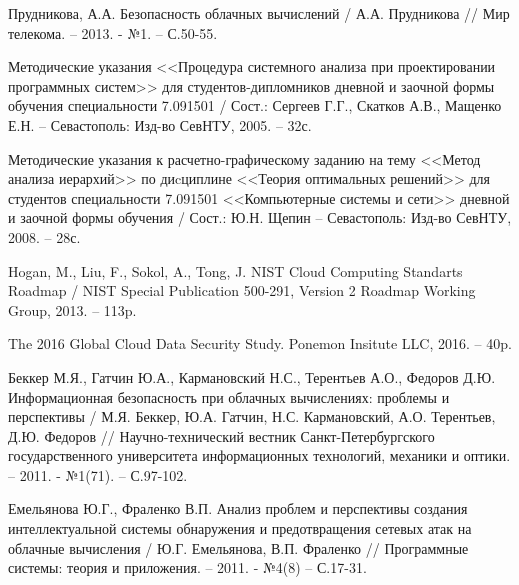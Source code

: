 \begingroup 
\renewcommand{\section}[2]{\anonsection{Библиографический список}}
\begin{thebibliography}{00}

    Прудникова, А.А.
    Безопасность облачных вычислений /
    А.А. Прудникова //
    Мир телекома. -- 2013. - №1.
    -- С.50-55.

    Методические указания <<Процедура системного анализа при проектировании программных систем>>
    для студентов-дипломников дневной и заочной формы обучения специальности 7.091501 /
    Сост.: Сергеев Г.Г., Скатков А.В., Мащенко Е.Н. -- Севастополь:
    Изд-во СевНТУ, 2005. -- 32с.

    Методические указания к расчетно-графическому заданию
    на тему <<Метод анализа иерархий>>  по диcциплине <<Теория оптимальных решений>>
    для студентов специальности 7.091501 <<Компьютерные системы и сети>>
    дневной и заочной формы обучения /
    Сост.: Ю.Н. Щепин -- Севастополь:
    Изд-во СевНТУ, 2008. -- 28с.

    Hogan, M., Liu, F., Sokol, A., Tong, J.
    NIST Cloud Computing Standarts Roadmap /
    NIST Special Publication 500-291, Version 2
    Roadmap Working Group, 2013. -- 113p.

    The 2016 Global Cloud Data Security Study.
    Ponemon Insitute LLC, 2016. -- 40p.

    Беккер М.Я., Гатчин Ю.А., Кармановский Н.С., Терентьев А.О., Федоров Д.Ю.
    Информационная безопасность при облачных вычислениях: проблемы и перспективы /
    М.Я. Беккер, Ю.А. Гатчин, Н.С. Кармановский, А.О. Терентьев, Д.Ю. Федоров //
    Научно-технический вестник Санкт-Петербургского государственного университета информационных технологий, механики и оптики. -- 2011. - №1(71).
    -- С.97-102.

    Емельянова Ю.Г., Фраленко В.П.
    Анализ проблем и перспективы создания интеллектуальной системы обнаружения и предотвращения сетевых атак на облачные вычисления /
    Ю.Г. Емельянова, В.П. Фраленко //
    Программные системы: теория и приложения. -- 2011. - №4(8)
    -- С.17-31.

\end{thebibliography}
\endgroup

\clearpage
